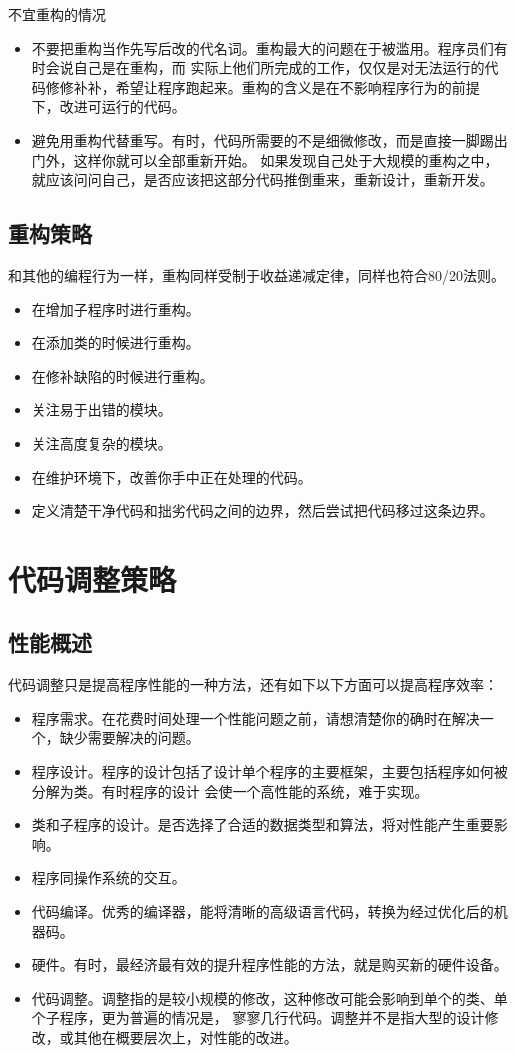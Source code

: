 \documentclass{article}
\begin{document}
\par
不宜重构的情况
\par
\begin{itemize}
    \item 不要把重构当作先写后改的代名词。重构最大的问题在于被滥用。程序员们有时会说自己是在重构，而
    实际上他们所完成的工作，仅仅是对无法运行的代码修修补补，希望让程序跑起来。重构的含义是在不影响程序行为的前提
    下，改进可运行的代码。
    \item 避免用重构代替重写。有时，代码所需要的不是细微修改，而是直接一脚踢出门外，这样你就可以全部重新开始。
    如果发现自己处于大规模的重构之中，就应该问问自己，是否应该把这部分代码推倒重来，重新设计，重新开发。
\end{itemize}

\subsection{重构策略}
和其他的编程行为一样，重构同样受制于收益递减定律，同样也符合80/20法则。
\begin{itemize}
    \item 在增加子程序时进行重构。
    \item 在添加类的时候进行重构。
    \item 在修补缺陷的时候进行重构。
    \item 关注易于出错的模块。
    \item 关注高度复杂的模块。
    \item 在维护环境下，改善你手中正在处理的代码。
    \item 定义清楚干净代码和拙劣代码之间的边界，然后尝试把代码移过这条边界。
\end{itemize}


\section{代码调整策略}
\subsection{性能概述}
代码调整只是提高程序性能的一种方法，还有如下以下方面可以提高程序效率：
\begin{itemize}
    \item 程序需求。在花费时间处理一个性能问题之前，请想清楚你的确时在解决一个，缺少需要解决的问题。
    \item 程序设计。程序的设计包括了设计单个程序的主要框架，主要包括程序如何被分解为类。有时程序的设计
    会使一个高性能的系统，难于实现。
    \item 类和子程序的设计。是否选择了合适的数据类型和算法，将对性能产生重要影响。
    \item 程序同操作系统的交互。
    \item 代码编译。优秀的编译器，能将清晰的高级语言代码，转换为经过优化后的机器码。
    \item 硬件。有时，最经济最有效的提升程序性能的方法，就是购买新的硬件设备。
    \item 代码调整。调整指的是较小规模的修改，这种修改可能会影响到单个的类、单个子程序，更为普遍的情况是，
    寥寥几行代码。调整并不是指大型的设计修改，或其他在概要层次上，对性能的改进。
\end{itemize}
\end{document}
